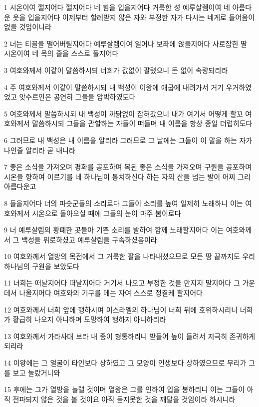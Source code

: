\par 1 시온이여 깰지어다 깰지어다 네 힘을 입을지어다 거룩한 성 예루살렘이여 네 아름다운 옷을 입을지어다 이제부터 할례받지 않은 자와 부정한 자가 다시는 네게로 들어옴이 없을 것임이니라
\par 2 너는 티끌을 떨어버릴지어다 예루살렘이여 일어나 보좌에 앉을지어다 사로잡힌 딸 시온이여 네 목의 줄을 스스로 풀지어다
\par 3 여호와께서 이같이 말씀하시되 너희가 값없이 팔렸으니 돈 없이 속량되리라
\par 4 주 여호와께서 이같이 말씀하시되 내 백성이 이왕에 애굽에 내려가서 거기 우거하였었고 앗수르인은 공연히 그들을 압박하였도다
\par 5 여호와께서 말씀하시되 내 백성이 까닭없이 잡혀갔으니 내가 여기서 어떻게 할꼬 여호와께서 말씀하시되 그들을 관할하는 자들이 떠들며 내 이름을 항상 종일 더럽히도다
\par 6 그러므로 내 백성은 내 이름을 알리라 그러므로 그 날에는 그들이 이 말을 하는 자가 나인줄 알리라 곧 내니라
\par 7 좋은 소식을 가져오며 평화를 공포하며 복된 좋은 소식을 가져오며 구원을 공포하며 시온을 향하여 이르기를 네 하나님이 통치하신다 하는 자의 산을 넘는 발이 어찌 그리 아름다운고
\par 8 들을지어다 너의 파숫군들의 소리로다 그들이 소리를 높여 일제히 노래하니 이는 여호와께서 시온으로 돌아오실 때에 그들의 눈이 마주 봄이로다
\par 9 너 예루살렘의 황폐한 곳들아 기쁜 소리를 발하여 함께 노래할지어다 이는 여호와께서 그 백성을 위로하셨고 예루살렘을 구속하셨음이라
\par 10 여호와께서 열방의 목전에서 그 거룩한 팔을 나타내셨으므로 모든 땅 끝까지도 우리 하나님의 구원을 보았도다
\par 11 너희는 떠날지어다 떠날지어다 거기서 나오고 부정한 것을 만지지 말지어다 그 가운데서 나올지어다 여호와의 기구를 메는 자여 스스로 정결케 할지어다
\par 12 여호와께서 너희 앞에 행하시며 이스라엘의 하나님이 너희 뒤에 호위하시리니 너희가 황급히 나오지 아니하며 도망하여 행하지 아니하리라
\par 13 여호와께서 가라사대 보라 내 종이 형통하리니 받들어 높이 들려서 지극히 존귀하게 되리라
\par 14 이왕에는 그 얼굴이 타인보다 상하였고 그 모양이 인생보다 상하였으므로 무리가 그를 보고 놀랐거니와
\par 15 후에는 그가 열방을 놀랠 것이며 열왕은 그를 인하여 입을 봉하리니 이는 그들이 아직 전파되지 않은 것을 볼 것이요 아직 듣지못한 것을 깨달을 것임이라 하시니라

